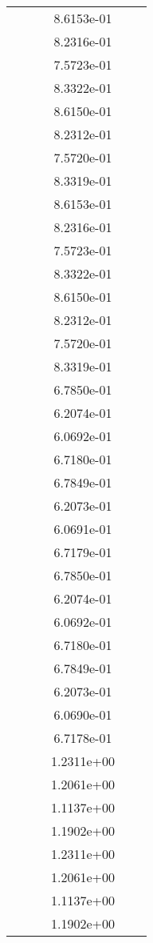 \begin{xltabular}{\textwidth}{r|rS[table-format=1.3e+2]S[table-format=1.4e+2]S[table-format=1.4e+2]S[table-format=-1.5]}
&  &  & 8.6153e-01 & & \\
&  &  & 8.2316e-01 & & \\
&  &  & 7.5723e-01 & & \\
&  &  & 8.3322e-01 & & \\
&  &  & 8.6150e-01 & & \\
&  &  & 8.2312e-01 & & \\
&  &  & 7.5720e-01 & & \\
&  &  & 8.3319e-01 & & \\
&  &  & 8.6153e-01 & & \\
&  &  & 8.2316e-01 & & \\
&  &  & 7.5723e-01 & & \\
&  &  & 8.3322e-01 & & \\
&  &  & 8.6150e-01 & & \\
&  &  & 8.2312e-01 & & \\
&  &  & 7.5720e-01 & & \\
&  &  & 8.3319e-01 & & \\
&  &  & 6.7850e-01 & & \\
&  &  & 6.2074e-01 & & \\
&  &  & 6.0692e-01 & & \\
&  &  & 6.7180e-01 & & \\
&  &  & 6.7849e-01 & & \\
&  &  & 6.2073e-01 & & \\
&  &  & 6.0691e-01 & & \\
&  &  & 6.7179e-01 & & \\
&  &  & 6.7850e-01 & & \\
&  &  & 6.2074e-01 & & \\
&  &  & 6.0692e-01 & & \\
&  &  & 6.7180e-01 & & \\
&  &  & 6.7849e-01 & & \\
&  &  & 6.2073e-01 & & \\
&  &  & 6.0690e-01 & & \\
&  &  & 6.7178e-01 & & \\
&  &  & 1.2311e+00 & & \\
&  &  & 1.2061e+00 & & \\
&  &  & 1.1137e+00 & & \\
&  &  & 1.1902e+00 & & \\
&  &  & 1.2311e+00 & & \\
&  &  & 1.2061e+00 & & \\
&  &  & 1.1137e+00 & & \\
&  &  & 1.1902e+00 & & \\

\end{xltabular}
